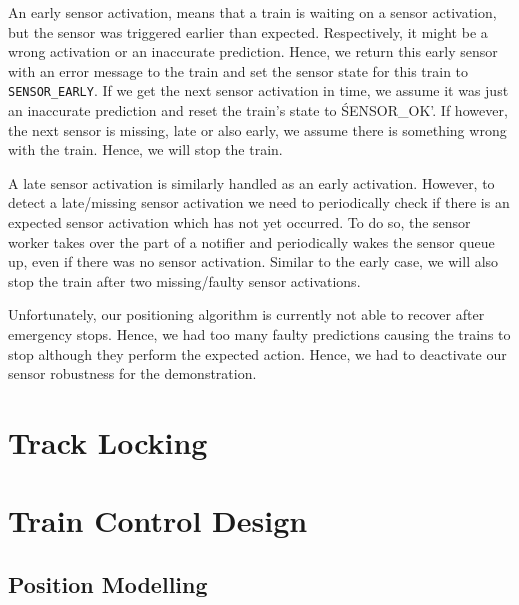 \documentclass[12pt, titlepage]{article}
\begin{document}
    An early sensor activation, means that a train is waiting on a sensor activation, but the sensor was triggered earlier than expected. 
    Respectively, it might be a wrong activation or an inaccurate prediction. 
    Hence, we return this early sensor with an error message to the train and set the sensor state for this train to \verb'SENSOR_EARLY'.
    If we get the next sensor activation in time, we assume it was just an inaccurate prediction and reset the train's state to \'SENSOR_OK'.
    If however, the next sensor is missing, late or also early, we assume there is something wrong with the train. 
    Hence, we will stop the train. 

    A late sensor activation is similarly handled as an early activation. 
    However, to detect a late/missing sensor activation we need to periodically check if there is an expected sensor activation which has not yet occurred. 
    To do so, the sensor worker takes over the part of a notifier and periodically wakes the sensor queue up, even if there was no sensor activation. 
    Similar to the early case, we will also stop the train after two missing/faulty sensor activations. 

    Unfortunately, our positioning algorithm is currently not able to recover after emergency stops. 
    Hence, we had too many faulty predictions causing the trains to stop although they perform the expected action.
    Hence, we had to deactivate our sensor robustness for the demonstration.

    
    \section{Track Locking}
    \label{sec:locking}
    
    
    \section{Train Control Design}
    
    \subsection{Position Modelling}
    \label{sec:positioning}
    
\end{document}
